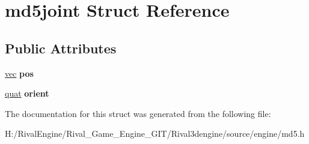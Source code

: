\hypertarget{structmd5joint}{}\section{md5joint Struct Reference}
\label{structmd5joint}
\subsection*{Public Attributes}
\begin{DoxyCompactItemize}
\item 
\mbox{\label{structmd5joint_a50a7cd2b5a1032b3c27b1d10244ccf32}} 
\hyperlink{structvec}{vec} {\bfseries pos}
\item 
\mbox{\label{structmd5joint_a7cacad51e0c5fb547fd96ab4fd701c5e}} 
\hyperlink{structquat}{quat} {\bfseries orient}
\end{DoxyCompactItemize}


The documentation for this struct was generated from the following file\+:\begin{DoxyCompactItemize}
\item 
H\+:/\+Rival\+Engine/\+Rival\+\_\+\+Game\+\_\+\+Engine\+\_\+\+G\+I\+T/\+Rival3dengine/source/engine/md5.\+h\end{DoxyCompactItemize}

